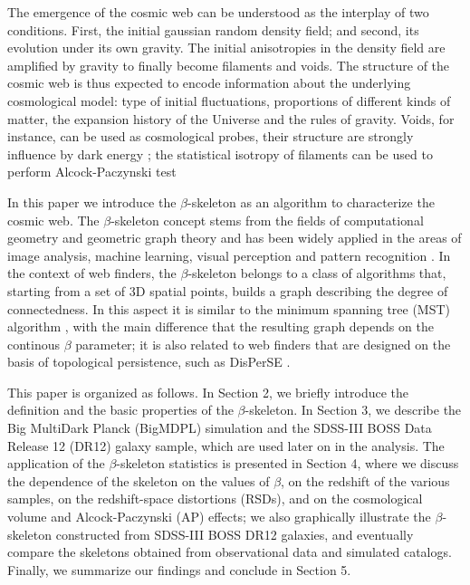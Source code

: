 \documentclass[useAMS,usenatbib]{mnras}
\begin{document}
The emergence of the cosmic web can be understood as the interplay of
two conditions. 
First, the initial gaussian random density field; and second, its
evolution under its own gravity.  
The initial anisotropies in the density field are amplified by gravity
to finally become filaments and voids.  
The structure of the cosmic web is thus expected to encode information
about the underlying cosmological model: type of initial fluctuations,
proportions of different kinds of matter, the expansion history of the
Universe and the rules of gravity.
Voids, for instance, can be used as cosmological probes, their
structure are strongly influence by dark energy \citep{2009ApJ...696L..10L,2012MNRAS.426..440B};
the statistical isotropy of filaments can be used to perform
Alcock-Paczynski test \citep{2014ApJ...796..137L}

In this paper we introduce the $\beta$-skeleton as an algorithm to
characterize the cosmic web.
The $\beta$-skeleton concept stems from the fields of computational geometry
and geometric graph theory and has been widely applied in the areas of
image analysis, machine learning, visual perception and pattern
recognition \citep{edelsbrunner1983shape,amenta1998crust,zhang2002locating}. 
In the context of web finders, the $\beta$-skeleton belongs to a class
of algorithms that, starting from a set of 3D spatial points, builds a
graph describing the degree of connectedness.
In this aspect it is similar to the minimum spanning tree (MST)
algorithm \citep{1985MNRAS.216...17B}, with the main difference that the resulting graph depends
on the continous $\beta$ parameter;
it is also related to web finders that are designed on the basis of
topological persistence, such as DisPerSE \citep{2011MNRAS.414..350S}. 


This paper is organized as follows. 
In Section 2, we briefly introduce the definition and the basic properties of the $\beta$-skeleton. 
In Section 3, we describe the Big MultiDark Planck (BigMDPL) simulation and the SDSS-III BOSS Data Release 12 (DR12) galaxy sample, which are used later on in the analysis. 
The application of the $\beta$-skeleton statistics is presented in Section 4, 
where we discuss the dependence of the skeleton on the values of $\beta$, 
on the redshift of the various samples, on the redshift-space distortions (RSDs), and on the cosmological volume and Alcock-Paczynski (AP) effects; 
we also graphically illustrate the $\beta$-skeleton constructed from SDSS-III BOSS DR12 galaxies,
and eventually compare the skeletons obtained from observational data and simulated catalogs.  
Finally, we summarize our findings and conclude in Section 5. 



 
\end{document}
